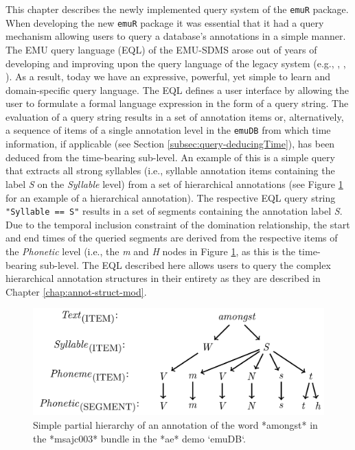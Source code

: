 \documentclass[]{book}
\theoremstyle{definition}
\theoremstyle{definition}
\theoremstyle{definition}
\theoremstyle{remark}
\begin{document}
This chapter describes the newly implemented query system of the
\texttt{emuR} package. When developing the new \texttt{emuR} package it
was essential that it had a query mechanism allowing users to query a
database's annotations in a simple manner. The EMU query language (EQL)
of the EMU-SDMS arose out of years of developing and improving upon the
query language of the legacy system (e.g., \citet{cassidy:sc2001a},
\citet{harrington:2010a}, \citet{john:2012a}). As a result, today we
have an expressive, powerful, yet simple to learn and domain-specific
query language. The EQL defines a user interface by allowing the user to
formulate a formal language expression in the form of a query string.
The evaluation of a query string results in a set of annotation items
or, alternatively, a sequence of items of a single annotation level in
the \texttt{emuDB} from which time information, if applicable (see
Section \ref{subsec:query-deducingTime}), has been deduced from the
time-bearing sub-level. An example of this is a simple query that
extracts all strong syllables (i.e., syllable annotation items
containing the label \emph{S} on the \emph{Syllable} level) from a set
of hierarchical annotations (see Figure \ref{fig:amongstHier} for an
example of a hierarchical annotation). The respective EQL query string
\texttt{"Syllable\ ==\ S"} results in a set of segments containing the
annotation label \emph{S}. Due to the temporal inclusion constraint of
the domination relationship, the start and end times of the queried
segments are derived from the respective items of the \emph{Phonetic}
level (i.e., the \emph{m} and \emph{H} nodes in Figure
\ref{fig:amongstHier}, as this is the time-bearing sub-level. The EQL
described here allows users to query the complex hierarchical annotation
structures in their entirety as they are described in Chapter
\ref{chap:annot-struct-mod}.

\begin{figure}

{\centering \includegraphics[width=0.75\linewidth]{pics/amongstHier} 

}

\caption{Simple partial hierarchy of an annotation of the word *amongst* in the *msajc003* bundle in the *ae* demo `emuDB`.}\label{fig:amongstHier}
\end{figure}
\end{document}
